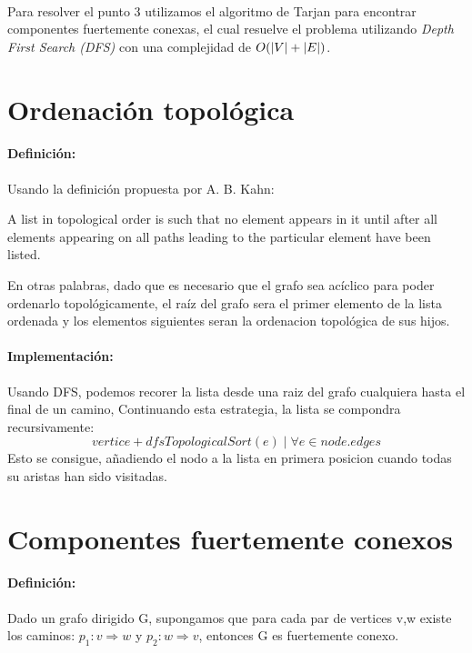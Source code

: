 \documentclass{article}
\DeclarePairedDelimiter\abs{\lvert}{\rvert}%
\begin{document}
\paragraph{}Para resolver el punto 3 utilizamos el algoritmo de Tarjan\cite{tarjan} para encontrar componentes fuertemente conexas,
el cual resuelve el problema utilizando \textit{Depth First Search (DFS)} con una complejidad de $ O(\abs{V} + \abs{E}) $.

\section{Ordenación topológica}
\paragraph{Definición:}Usando la definición propuesta por A. B. Kahn\cite{kahn}:
\begin{displayquote}
A list in topological order is such that no element appears in it until after all elements appearing on all paths leading to the particular element have been listed. 
\end{displayquote}
En otras palabras, dado que es necesario que el grafo sea acíclico para poder ordenarlo topológicamente, el raíz del grafo sera el primer elemento de la lista ordenada
y los elementos siguientes seran la ordenacion topológica de sus hijos.
\paragraph{Implementación:} Usando DFS, podemos recorer la lista desde una raiz del grafo cualquiera hasta el final de un camino,
Continuando esta estrategia, la lista se compondra recursivamente:
 \[ vertice + dfsTopologicalSort(e) \mid \forall e \in node.edges \] 
Esto se consigue, añadiendo el nodo a la lista en primera posicion cuando todas su aristas han sido visitadas.
\section{Componentes fuertemente conexos}
\paragraph{Definición:} Dado un grafo dirigido G, supongamos que para cada par de vertices v,w
existe los caminos: $p_1: v \Rightarrow w$ y $p_2: w \Rightarrow v$, entonces G es fuertemente conexo.
\end{document}
